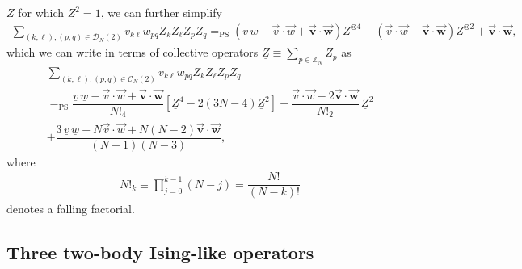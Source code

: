 \documentclass[nofootinbib,notitlepage,11pt]{revtex4-2}
\newcommand{\f}[2]{\dfrac{#1}{#2}} %
\newcommand{\p}[1]{\left(#1\right)} %
\renewcommand{\sp}[1]{\left[#1\right]} %
\renewcommand{\c}{\cdot} %
\newcommand{\m}{\bm} %
\renewcommand{\v}{\vec} %
\newcommand{\1}{\mathds{1}}
\newcommand{\C}{\mathcal{C}}
\newcommand{\D}{\mathcal{D}}
\newcommand{\ZZ}{\mathbb{Z}}
\newcommand{\EQPS}{=_{\text{PS}}}
\newcommand{\col}{\underline}
\begin{document}
$Z$ for which $Z^2=1$, we can further simplify
\begin{align}
  \sum_{\p{k,\ell},\p{p,q}\in\D_N\p{2}} v_{k\ell} w_{pq}
  Z_k Z_\ell Z_p Z_q
  \EQPS \p{\col{v}\,\col{w} - \v v\c\v w + \v{\m v}\c\v{\m w}}
  Z^{\otimes 4}
  + \p{\v v\c\v w - \v{\m v} \c \v{\m w}} Z^{\otimes 2}
  + \v{\m v}\c\v{\m w},
\end{align}
which we can write in terms of collective operators
$\col{Z}\equiv\sum_{p\in\ZZ_N}Z_p$ as
\begin{multline}
  \sum_{\p{k,\ell},\p{p,q}\in\C_N\p{2}} v_{k\ell} w_{pq}
  Z_k Z_\ell Z_p Z_q \\
  \EQPS \f{\col{v}\,\col{w} - \v v\c\v w + \v{\m v}\c\v{\m w}}{N!_4}
  \sp{\col{Z}^4 - 2\p{3N-4} \col{Z}^2}
  + \f{\v v\c\v w - 2 \v{\m v} \c \v{\m w}}{N!_2}\, \col{Z}^2 \\
  + \f{3\,\col{v}\,\col{w} - N \v v\c\v w + N\p{N-2}\v{\m v}\c\v{\m
      w}}{\p{N-1}\p{N-3}},
\end{multline}
where
\begin{align}
  N!_k \equiv \prod_{j=0}^{k-1} \p{N-j} = \f{N!}{\p{N-k}!}
\end{align}
denotes a falling factorial.

\subsection{Three two-body Ising-like operators}
\end{document}
